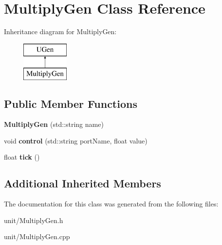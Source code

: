 \hypertarget{classMultiplyGen}{}\section{Multiply\+Gen Class Reference}
\label{classMultiplyGen}
Inheritance diagram for Multiply\+Gen\+:\begin{figure}[H]
\begin{center}
\leavevmode
\includegraphics[height=2.000000cm]{classMultiplyGen}
\end{center}
\end{figure}
\subsection*{Public Member Functions}
\begin{DoxyCompactItemize}
\item 
{\bfseries Multiply\+Gen} (std\+::string name)\hypertarget{classMultiplyGen_a8c63aba9e9be634e03f900182b4a1d7a}{}\label{classMultiplyGen_a8c63aba9e9be634e03f900182b4a1d7a}

\item 
void {\bfseries control} (std\+::string port\+Name, float value)\hypertarget{classMultiplyGen_a399981309ef24f24c7044172e58c1e8a}{}\label{classMultiplyGen_a399981309ef24f24c7044172e58c1e8a}

\item 
float {\bfseries tick} ()\hypertarget{classMultiplyGen_abeeb8a84f91375454120639a9bb810fb}{}\label{classMultiplyGen_abeeb8a84f91375454120639a9bb810fb}

\end{DoxyCompactItemize}
\subsection*{Additional Inherited Members}


The documentation for this class was generated from the following files\+:\begin{DoxyCompactItemize}
\item 
unit/Multiply\+Gen.\+h\item 
unit/Multiply\+Gen.\+cpp\end{DoxyCompactItemize}
